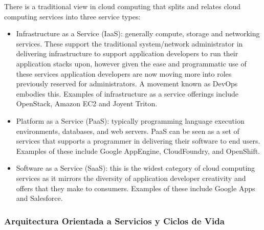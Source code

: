         There is a traditional view in cloud computing that splits and relates cloud computing services into three service types:
        \begin{itemize}
            \item Infrastructure as a Service (IaaS): generally compute, storage and networking services. These support the traditional system/network administrator in delivering infrastructure to support application developers to run their application stacks upon, however given the ease and programmatic use of these services application developers are now moving more into roles previously reserved for administrators. A movement known as DevOps embodies this. Examples of infrastructure as a service offerings include \addref{}OpenStack, \addref{}Amazon EC2 and \addref{}Joyent Triton.
            \item Platform as a Service (PaaS): typically programming language execution environments, databases, and web servers. PaaS can be seen as a set of services that supports a programmer in delivering their software to end users. Examples of these include Google \addref{}AppEngine, \addref{}CloudFoundry, and \addref{}OpenShift.
            \item Software as a Service (SaaS): this is the widest category of cloud computing services as it mirrors the diversity of application developer creativity and offers that they make to consumers. Examples of these include \addref{}Google Apps and \addref{}Salesforce.
        \end{itemize}

        \subsubsection{Arquitectura Orientada a Servicios y Ciclos de Vida}
        
